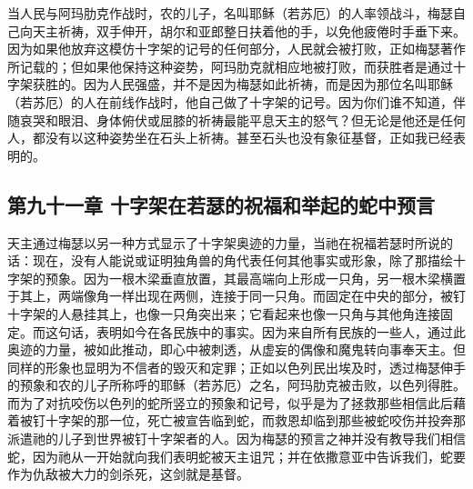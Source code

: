 当人民与阿玛肋克作战时，农的儿子，名叫耶稣（若苏厄）的人率领战斗，梅瑟自己向天主祈祷，双手伸开，胡尔和亚郎整日扶着他的手，以免他疲倦时手垂下来。因为如果他放弃这模仿十字架的记号的任何部分，人民就会被打败，正如梅瑟著作所记载的；但如果他保持这种姿势，阿玛肋克就相应地被打败，而获胜者是通过十字架获胜的。因为人民强盛，并不是因为梅瑟如此祈祷，而是因为那位名叫耶稣（若苏厄）的人在前线作战时，他自己做了十字架的记号。因为你们谁不知道，伴随哀哭和眼泪、身体俯伏或屈膝的祈祷最能平息天主的怒气？但无论是他还是任何人，都没有以这种姿势坐在石头上祈祷。甚至石头也没有象征基督，正如我已经表明的。\par


\subsection{第九十一章 十字架在若瑟的祝福和举起的蛇中预言}

天主通过梅瑟以另一种方式显示了十字架奥迹的力量，当祂在祝福若瑟时所说的话：现在，没有人能说或证明独角兽的角代表任何其他事实或形象，除了那描绘十字架的预象。因为一根木梁垂直放置，其最高端向上形成一只角，另一根木梁横置于其上，两端像角一样出现在两侧，连接于同一只角。而固定在中央的部分，被钉十字架的人悬挂其上，也像一只角突出来；它看起来也像一只角与其他角连接固定。而这句话，表明如今在各民族中的事实。因为来自所有民族的一些人，通过此奥迹的力量，被如此推动，即心中被刺透，从虚妄的偶像和魔鬼转向事奉天主。但同样的形象也显明为不信者的毁灭和定罪；正如以色列民出埃及时，透过梅瑟伸手的预象和农的儿子所称呼的耶稣（若苏厄）之名，阿玛肋克被击败，以色列得胜。而为了对抗咬伤以色列的蛇所竖立的预象和记号，似乎是为了拯救那些相信此后藉着被钉十字架的那一位，死亡被宣告临到蛇，而救恩却临到那些被蛇咬伤并投奔那派遣祂的儿子到世界被钉十字架者的人。因为梅瑟的预言之神并没有教导我们相信蛇，因为祂从一开始就向我们表明蛇被天主诅咒；并在依撒意亚中告诉我们，蛇要作为仇敌被大力的剑杀死，这剑就是基督。\par


